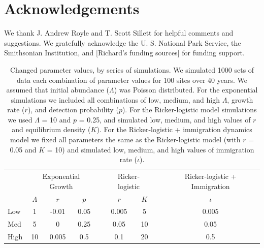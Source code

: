 \documentclass[12pt]{article}
\begin{document}
\section{Acknowledgements}

We thank J. Andrew Royle and T. Scott Sillett for helpful
comments and suggestions. We gratefully acknowledge the U. S. National Park 
Service, the Smithsonian Institution, and [Richard's funding sources] for funding support.




\newpage



\begin{table}[t]
  \centering
\caption{Changed parameter values, by series of simulations.  We
simulated 1000 sets of data each combination of parameter values
for 100 sites over 40 years.  We assumed that initial abundance
($\Lambda$) was Poisson distributed.  For the exponential 
simulations we included all combinations of low, medium, and
high $\Lambda$, growth rate ($r$), and detection probability ($p$).
For the Ricker-logistic model simulations we used $\Lambda$ = 10 and $p$ = 0.25, and
simulated low, medium, and high values of $r$ and equilibrium density ($K$).
For the Ricker-logistic + immigration dynamics model we fixed all parameters the
same as the Ricker-logistic model (with $r$ = 0.05 and $K$ = 10) and
simulated low, medium, and high values of immigration rate ($\iota$).}  
\begin{tabular}{lcccccccc}
    \hline
    & \multicolumn{3}{c}{Exponential Growth} && \multicolumn{2}{c}{Ricker-logistic} &&
    Ricker-logistic + Immigration \\
    \cline{2-4}     \cline{6-7}    \cline{9-9}
& $\Lambda$ & $r$ & $p$ && $r$  & $K$ && $\iota$  \\    
\hline
    Low	        &1	&-0.01	&0.05	&&0.005	 &5	&&0.005  \\
    Med	        &5	&0	&0.25	&&0.05	&10	&&0.05   \\
    High		 &10 &0.005	&0.5	&&0.1	&20	&&0.5    \\
    \hline
  \end{tabular}
\end{table}

\newpage
\end{document}
